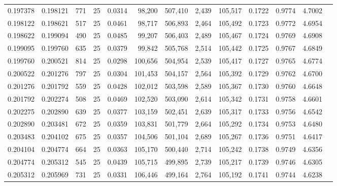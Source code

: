 \begin{tabular}{rrrrrrrrrrrrr}
0.197378 & 0.198121 &   771 &  25 &                                     0.0314 &  98,200 & 507,410 &   2,439 & 105,517 & 0.1722 & 0.9774 & 4.7002 \\
0.198122 & 0.198621 &   517 &  25 &                                     0.0461 &  98,717 & 506,893 &   2,464 & 105,492 & 0.1723 & 0.9772 & 4.6954 \\
0.198622 & 0.199094 &   490 &  25 &                                     0.0485 &  99,207 & 506,403 &   2,489 & 105,467 & 0.1724 & 0.9769 & 4.6908 \\
0.199095 & 0.199760 &   635 &  25 &                                     0.0379 &  99,842 & 505,768 &   2,514 & 105,442 & 0.1725 & 0.9767 & 4.6849 \\
0.199760 & 0.200521 &   814 &  25 &                                     0.0298 & 100,656 & 504,954 &   2,539 & 105,417 & 0.1727 & 0.9765 & 4.6774 \\
0.200522 & 0.201276 &   797 &  25 &                                     0.0304 & 101,453 & 504,157 &   2,564 & 105,392 & 0.1729 & 0.9762 & 4.6700 \\
0.201276 & 0.201792 &   559 &  25 &                                     0.0428 & 102,012 & 503,598 &   2,589 & 105,367 & 0.1730 & 0.9760 & 4.6648 \\
0.201792 & 0.202274 &   508 &  25 &                                     0.0469 & 102,520 & 503,090 &   2,614 & 105,342 & 0.1731 & 0.9758 & 4.6601 \\
0.202275 & 0.202890 &   639 &  25 &                                     0.0377 & 103,159 & 502,451 &   2,639 & 105,317 & 0.1733 & 0.9756 & 4.6542 \\
0.202890 & 0.203481 &   672 &  25 &                                     0.0359 & 103,831 & 501,779 &   2,664 & 105,292 & 0.1734 & 0.9753 & 4.6480 \\
0.203483 & 0.204102 &   675 &  25 &                                     0.0357 & 104,506 & 501,104 &   2,689 & 105,267 & 0.1736 & 0.9751 & 4.6417 \\
0.204104 & 0.204774 &   664 &  25 &                                     0.0363 & 105,170 & 500,440 &   2,714 & 105,242 & 0.1738 & 0.9749 & 4.6356 \\
0.204774 & 0.205312 &   545 &  25 &                                     0.0439 & 105,715 & 499,895 &   2,739 & 105,217 & 0.1739 & 0.9746 & 4.6305 \\
0.205312 & 0.205969 &   731 &  25 &                                     0.0331 & 106,446 & 499,164 &   2,764 & 105,192 & 0.1741 & 0.9744 & 4.6238 \\

\end{tabular}
